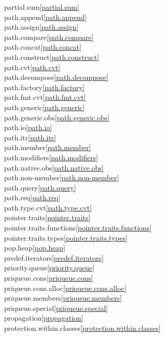\begin{multicols}{2}
partial.sum\quad\ref{partial.sum}\\
path.append\quad\ref{path.append}\\
path.assign\quad\ref{path.assign}\\
path.compare\quad\ref{path.compare}\\
path.concat\quad\ref{path.concat}\\
path.construct\quad\ref{path.construct}\\
path.cvt\quad\ref{path.cvt}\\
path.decompose\quad\ref{path.decompose}\\
path.factory\quad\ref{path.factory}\\
path.fmt.cvt\quad\ref{path.fmt.cvt}\\
path.generic\quad\ref{path.generic}\\
path.generic.obs\quad\ref{path.generic.obs}\\
path.io\quad\ref{path.io}\\
path.itr\quad\ref{path.itr}\\
path.member\quad\ref{path.member}\\
path.modifiers\quad\ref{path.modifiers}\\
path.native.obs\quad\ref{path.native.obs}\\
path.non-member\quad\ref{path.non-member}\\
path.query\quad\ref{path.query}\\
path.req\quad\ref{path.req}\\
path.type.cvt\quad\ref{path.type.cvt}\\
pointer.traits\quad\ref{pointer.traits}\\
pointer.traits.functions\quad\ref{pointer.traits.functions}\\
pointer.traits.types\quad\ref{pointer.traits.types}\\
pop.heap\quad\ref{pop.heap}\\
predef.iterators\quad\ref{predef.iterators}\\
priority.queue\quad\ref{priority.queue}\\
priqueue.cons\quad\ref{priqueue.cons}\\
priqueue.cons.alloc\quad\ref{priqueue.cons.alloc}\\
priqueue.members\quad\ref{priqueue.members}\\
priqueue.special\quad\ref{priqueue.special}\\
propagation\quad\ref{propagation}\\
protection.within.classes\quad\ref{protection.within.classes}\\

\end{multicols}
